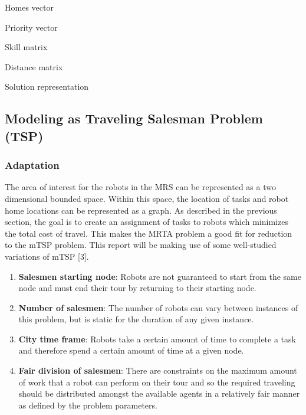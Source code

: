 \documentclass[a4paper]{article}
\begin{document}
Homes vector

Priority vector

Skill matrix

Distance matrix

Solution representation

\subsection{Modeling as Traveling Salesman Problem (TSP)}

\subsubsection{Adaptation}
The area of interest for the robots in the MRS can be represented as a two dimensional bounded space. Within this space, the location of tasks and robot home locations can be represented as a graph. As described in the previous section, the goal is to create an assignment of tasks to robots which minimizes the total cost of travel. This makes the MRTA problem a good fit for reduction to the mTSP problem. This report will be making use of some well-studied variations of mTSP [3].
\begin{enumerate}
\item \textbf{Salesmen starting node}: Robots are not guaranteed to start from the same node and must end their tour by returning to their starting node.
\item \textbf{Number of salesmen}: The number of robots can vary between instances of this problem, but is static for the duration of any given instance.
\item \textbf{City time frame}: Robots take a certain amount of time to complete a task and therefore spend a certain amount of time at a given node.
\item \textbf{Fair division of salesmen}: There are constraints on the maximum amount of work that a robot can perform on their tour and so the required traveling should be distributed amongst the available agents in a relatively fair manner as defined by the problem parameters.
\end{enumerate}
\end{document}
